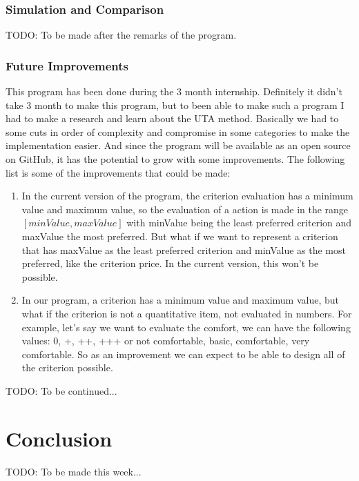\documentclass{report}
\begin{document}
\subsection{Simulation and Comparison}
TODO: To be made after the remarks of the program.

\subsection{Future Improvements}
This program has been done during the 3 month internship. Definitely it didn't take 3 month to make this program, but to been able to make such a program I had to make a research and learn about the UTA method. Basically we had to some cuts in order of complexity and compromise in some categories to make the implementation easier. And since the program will be available as an open source on GitHub, it has the potential to grow with some improvements. The following list is some of the improvements that could be made:\\
\begin{enumerate}
\item In the current version of the program, the criterion evaluation has a minimum value and maximum value, so the evaluation of a action is made in the range $[minValue, maxValue]$ with minValue being the least preferred criterion and maxValue the most preferred. But what if we want to represent a criterion that has maxValue as the least preferred criterion and minValue as the most preferred, like the criterion price. In the current version, this won't be possible. 
\item In our program, a criterion has a minimum value and maximum value, but what if the criterion is not a quantitative item, not evaluated in numbers. For example, let's say we want to evaluate the comfort, we can have the following values: 0, +, ++, +++ or not comfortable, basic, comfortable, very comfortable. So as an improvement we can expect to be able to design all of the criterion possible.  
\end{enumerate} 

TODO: To be continued...

\chapter{Conclusion}
TODO: To be made this week...
\end{document}
